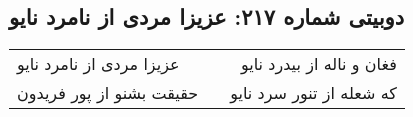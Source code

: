 \begin{center}
\section*{دوبیتی شماره ۲۱۷: عزیزا مردی از نامرد نایو}
\label{sec:217}
\begin{longtable}{l p{0.5cm} r}
عزیزا مردی از نامرد نایو
&&
فغان و ناله از بیدرد نایو
\\
حقیقت بشنو از پور فریدون
&&
که شعله از تنور سرد نایو
\\
\end{longtable}
\end{center}
